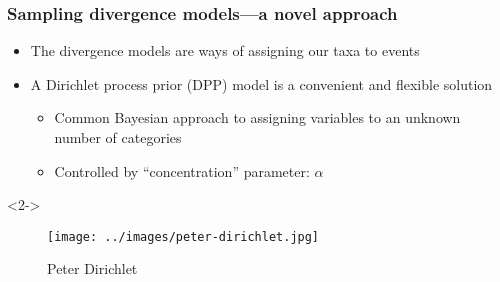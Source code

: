\begin{frame}[t]
    \frametitle{Sampling divergence models---a novel approach}
    \begin{itemize}[<+->]
        \item The divergence models are ways of assigning our taxa to events
        \item A Dirichlet process prior (DPP) model is a convenient and flexible
            solution
            \begin{itemize}[<+->]
                \item Common Bayesian approach to assigning variables to an
                    unknown number of categories
                \item Controlled by ``concentration'' parameter: $\alpha$
            \end{itemize}
    \end{itemize}

    \begin{uncoverenv}<2->
    \begin{figure}
    \begin{center}
        \texttt{[image: ../images/peter-dirichlet.jpg]}
        \caption{Peter Dirichlet}
    \end{center}
    \end{figure}
    \end{uncoverenv}
\end{frame}

